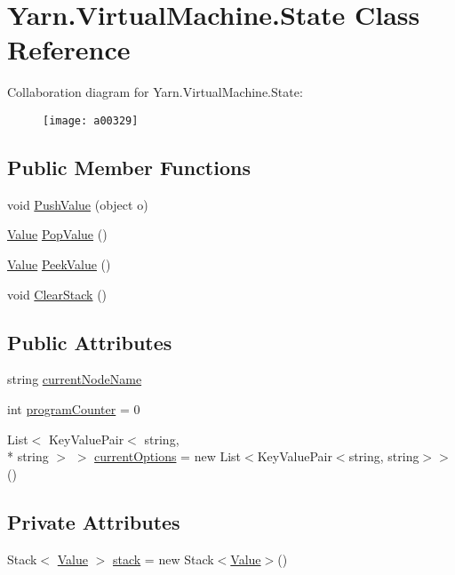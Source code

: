 \hypertarget{a00089}{\section{Yarn.\-Virtual\-Machine.\-State Class Reference}
\label{a00089}
}


Collaboration diagram for Yarn.\-Virtual\-Machine.\-State\-:
\nopagebreak
\begin{figure}[H]
\begin{center}
\leavevmode
\texttt{[image: a00329]}
\end{center}
\end{figure}
\subsection*{Public Member Functions}
\begin{DoxyCompactItemize}
\item 
void \hyperlink{a00089_aace44f5b85b9f746fede834becda4a8e}{Push\-Value} (object o)
\item 
\hyperlink{a00100}{Value} \hyperlink{a00089_a36881a888ea2839d74c3d4e7c199f4ee}{Pop\-Value} ()
\item 
\hyperlink{a00100}{Value} \hyperlink{a00089_a54fd5b64ec94e937e771846167242dc2}{Peek\-Value} ()
\item 
void \hyperlink{a00089_a9c787097fbbbbf1680e4960cda092535}{Clear\-Stack} ()
\end{DoxyCompactItemize}
\subsection*{Public Attributes}
\begin{DoxyCompactItemize}
\item 
string \hyperlink{a00089_a86f481fad527f719b49f8fee6ff79764}{current\-Node\-Name}
\item 
int \hyperlink{a00089_a2c76546b54b4fb573d7f14d79ce230a3}{program\-Counter} = 0
\item 
List$<$ Key\-Value\-Pair$<$ string, \\*
string $>$ $>$ \hyperlink{a00089_ab816dfea32ecda23282700f01454e0a9}{current\-Options} = new List$<$Key\-Value\-Pair$<$string, string$>$$>$()
\end{DoxyCompactItemize}
\subsection*{Private Attributes}
\begin{DoxyCompactItemize}
\item 
Stack$<$ \hyperlink{a00100}{Value} $>$ \hyperlink{a00089_a0bc84abf38b3ff31cbb47363b851c233}{stack} = new Stack$<$\hyperlink{a00100}{Value}$>$()
\end{DoxyCompactItemize}


